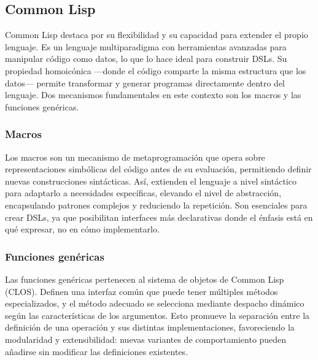 \documentclass{article}
\begin{document}
\subsection{Common Lisp}

Common Lisp destaca por su flexibilidad y su capacidad para extender el propio lenguaje. Es un lenguaje multiparadigma con herramientas avanzadas para manipular código como datos, lo que lo hace ideal para construir DSLs. Su propiedad homoicónica ---donde el código comparte la misma estructura que los datos--- permite transformar y generar programas directamente dentro del lenguaje. Dos mecanismos fundamentales en este contexto son los macros y las funciones genéricas.

\subsubsection{Macros}

Los macros son un mecanismo de metaprogramación que opera sobre representaciones simbólicas del código antes de su evaluación, permitiendo definir nuevas construcciones sintácticas. Así, extienden el lenguaje a nivel sintáctico para adaptarlo a necesidades específicas, elevando el nivel de abstracción, encapsulando patrones complejos y reduciendo la repetición. Son esenciales para crear DSLs, ya que posibilitan interfaces más declarativas donde el énfasis está en qué expresar, no en cómo implementarlo.

\subsubsection{Funciones genéricas}

Las funciones genéricas pertenecen al sistema de objetos de Common Lisp (CLOS). Definen una interfaz común que puede tener múltiples métodos especializados, y el método adecuado se selecciona mediante despacho dinámico según las características de los argumentos. Esto promueve la separación entre la definición de una operación y sus distintas implementaciones, favoreciendo la modularidad y extensibilidad: nuevas variantes de comportamiento pueden añadirse sin modificar las definiciones existentes.




\end{document}
